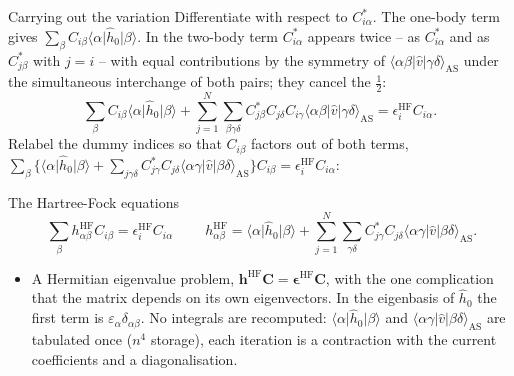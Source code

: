 \documentclass[aspectratio=169,10pt]{beamer}
\newcommand{\element}[3]{\langle #1\vert #2\vert #3\rangle}
\begin{document}
\begin{frame}{Carrying out the variation}
  \footnotesize
  Differentiate with respect to $C_{i\alpha}^{*}$. The one-body term gives $\sum_\beta C_{i\beta}\element{\alpha}{\hat{h}_0}{\beta}$. In the two-body term $C_{i\alpha}^{*}$ appears twice -- as $C_{i\alpha}^{*}$ and as $C_{j\beta}^{*}$ with $j=i$ -- with equal contributions by the symmetry of $\element{\alpha\beta}{\hat{v}}{\gamma\delta}_{\mathrm{AS}}$ under the simultaneous interchange of both pairs; they cancel the $\frac12$:
  \[
    \sum_\beta C_{i\beta}\element{\alpha}{\hat{h}_0}{\beta}
    +\sum_{j=1}^{N}\sum_{\beta\gamma\delta}C_{j\beta}^{*}C_{j\delta}C_{i\gamma}\element{\alpha\beta}{\hat{v}}{\gamma\delta}_{\mathrm{AS}}
    =\epsilon_i^{\mathrm{HF}}C_{i\alpha} .
  \]
  Relabel the dummy indices so that $C_{i\beta}$ factors out of both terms, $\sum_\beta\{\element{\alpha}{\hat{h}_0}{\beta}+\sum_{j\gamma\delta}C_{j\gamma}^{*}C_{j\delta}\element{\alpha\gamma}{\hat{v}}{\beta\delta}_{\mathrm{AS}}\}C_{i\beta}=\epsilon_i^{\mathrm{HF}}C_{i\alpha}$:
  \begin{block}{The Hartree-Fock equations}
    \[
      \boxed{\;\sum_\beta h^{\mathrm{HF}}_{\alpha\beta}C_{i\beta}=\epsilon_i^{\mathrm{HF}}C_{i\alpha}\;}
      \qquad
      h^{\mathrm{HF}}_{\alpha\beta}=\element{\alpha}{\hat{h}_0}{\beta}+\sum_{j=1}^{N}\sum_{\gamma\delta}C_{j\gamma}^{*}C_{j\delta}\element{\alpha\gamma}{\hat{v}}{\beta\delta}_{\mathrm{AS}} .
    \]
  \end{block}
  \begin{itemize}
    \item A Hermitian eigenvalue problem, $\bm{h}^{\mathrm{HF}}\bm{C}=\bm{\epsilon}^{\mathrm{HF}}\bm{C}$, with the one complication that \alert{the matrix depends on its own eigenvectors}. In the eigenbasis of $\hat{h}_0$ the first term is $\varepsilon_\alpha\delta_{\alpha\beta}$. No integrals are recomputed: $\element{\alpha}{\hat{h}_0}{\beta}$ and $\element{\alpha\gamma}{\hat{v}}{\beta\delta}_{\mathrm{AS}}$ are tabulated once ($n^4$ storage), each iteration is a contraction with the current coefficients and a diagonalisation.
  \end{itemize}
\end{frame}
\end{document}
